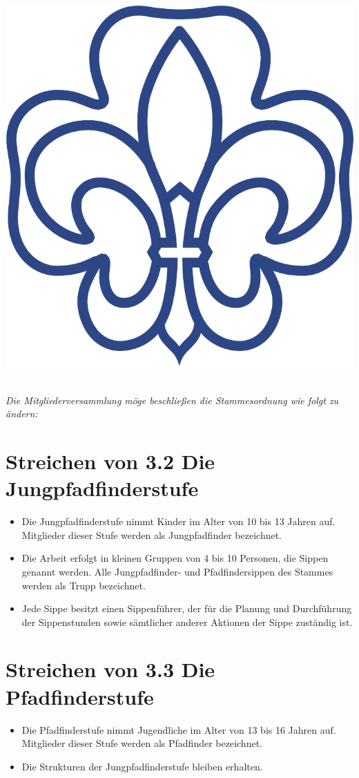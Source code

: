 \documentclass[a4paper]{article}
\begin{document}
\begin{center}
\begin{minipage}{.2\textwidth}
        \includegraphics[width=.85\linewidth]{Zeichen.pdf}
    \end{minipage}%
\end{center}
~\\[0.5cm] 

\emph{Die Mitgliederversammlung möge beschließen die Stammesordnung wie folgt zu ändern:}

\section{Streichen von 3.2 Die Jungpfadfinderstufe}
    \begin{itemize}
        \item Die Jungpfadfinderstufe nimmt Kinder im Alter von 10 bis 13 Jahren auf. Mitglieder dieser Stufe werden als Jungpfadfinder bezeichnet.
        \item Die Arbeit erfolgt in kleinen Gruppen von 4 bis 10 Personen, die Sippen genannt werden. Alle Jungpfadfinder- und Pfadfindersippen des Stammes werden als Trupp bezeichnet.
        \item Jede Sippe besitzt einen Sippenführer, der für die Planung und Durchführung der Sippenstunden sowie sämtlicher anderer Aktionen der Sippe zuständig ist.
    \end{itemize}

\section{Streichen von 3.3 Die Pfadfinderstufe}
    \begin{itemize}
        \item Die Pfadfinderstufe nimmt Jugendliche im Alter von 13 bis 16 Jahren auf. Mitglieder dieser
Stufe werden als Pfadfinder bezeichnet.
        \item Die Strukturen der Jungpfadfinderstufe bleiben erhalten.
    \end{itemize}
\end{document}
